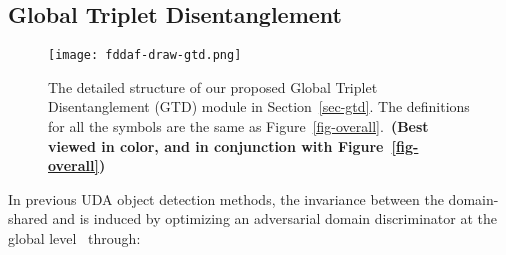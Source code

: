 \documentclass[journal]{IEEEtran}
\begin{document}
\begin{table}[!htb]
\centering
\caption{Detailed model structure of the overall architecture.  and  represent the input and output channel numbers of each layer, respectively. , , and  are the kernel size, stride, and padding of each layer.}
\label{table-overall-net}
\end{table}


\subsection{Global Triplet Disentanglement\label{sec-gtd}}


\begin{figure}[t]
\centering
\texttt{[image: fddaf-draw-gtd.png]} \caption{The detailed structure of our proposed Global Triplet Disentanglement (GTD) module in Section~\ref{sec-gtd}. The definitions for all the symbols are the same as Figure~\ref{fig-overall}.~\textbf{(Best viewed in color, and in conjunction with Figure~\ref{fig-overall})}}
\label{fig-gtd}
\end{figure}



In previous UDA object detection methods, the invariance between the domain-shared  and  is induced by optimizing an adversarial domain discriminator at the global level~\cite{chen2018domain,saito2019strong,he2020domain} through:
\end{document}
